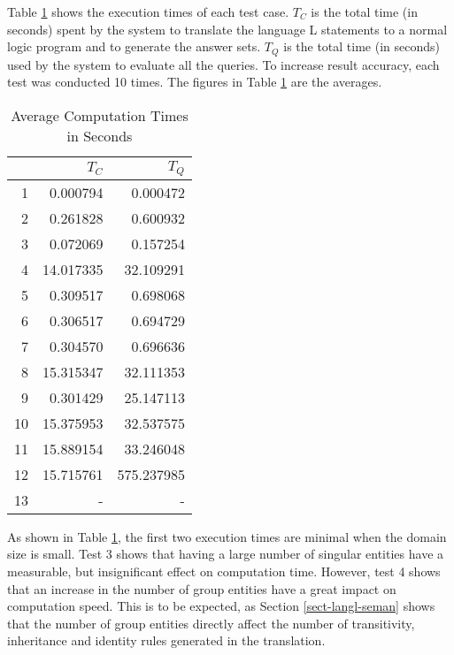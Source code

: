 \documentclass[11pt]{report}
\begin{document}
      Table \ref{tabl-polup-teres} shows the execution times of each test case.
      $T_{C}$ is the total time (in seconds) spent by the system to translate
      the language {\cal L} statements to a normal logic program and to
      generate the answer sets. $T_{Q}$ is the total time (in seconds) used by
      the system to evaluate all the queries. To increase result accuracy,
      each test was conducted 10 times. The figures in Table
      \ref{tabl-polup-teres} are the averages.

      \begin{table}[tbhp]
        \begin{center}
          \begin{tabular}[t]{|r|r|r|}
            \hline
            &
            \textbf{$T_{C}$} &
            \textbf{$T_{Q}$} \\
            \hline
            1 & 0.000794 & 0.000472 \\
            \hline
            2 & 0.261828  & 0.600932 \\
            \hline
            3 & 0.072069 & 0.157254 \\
            \hline
            4 & 14.017335 & 32.109291 \\
            \hline
            5 & 0.309517 & 0.698068 \\
            \hline
            6 & 0.306517 & 0.694729 \\
            \hline
            7 & 0.304570 & 0.696636 \\
            \hline
            8 & 15.315347 & 32.111353 \\
            \hline
            9 & 0.301429 & 25.147113 \\
            \hline
            10 & 15.375953 & 32.537575 \\
            \hline
            11 & 15.889154 & 33.246048 \\
            \hline
            12 & 15.715761 & 575.237985 \\
            \hline
            13 & - & - \\
            \hline
          \end{tabular}
        \end{center}
        \caption{Average Computation Times in Seconds}
        \label{tabl-polup-teres}
      \end{table}

      As shown in Table \ref{tabl-polup-teres}, the first two execution times
      are minimal when the domain size is small. Test 3 shows that having a
      large number of singular entities have a measurable, but insignificant
      effect on computation time. However, test 4 shows that an increase in
      the number of group entities have a great impact on computation speed.
      This is to be expected, as Section \ref{sect-langl-seman} shows that the
      number of group entities directly affect the number of transitivity,
      inheritance and identity rules generated in the translation.
\end{document}
